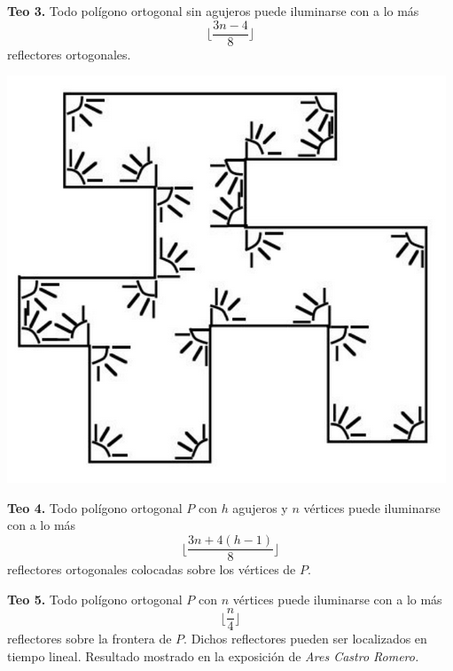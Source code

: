 \begin{center}
  \textbf{Teo 3.} Todo polígono ortogonal sin agujeros puede iluminarse
  con a lo más
  \[\lfloor \frac{3n - 4}{8} \rfloor\]
  reflectores ortogonales.
  
  \includegraphics[scale=0.40]{./Im1.png}\\[0.4cm]
\end{center}

\begin{center}
  \textbf{Teo 4.} Todo polígono ortogonal $P$ con $h$ agujeros y $n$ vértices
  puede iluminarse con a lo más
  \[\lfloor\frac{3n + 4(h-1)}{8}\rfloor\]
  reflectores ortogonales colocadas sobre los vértices de $P$.
\end{center}

\begin{center}
  \textbf{Teo 5.} Todo polígono ortogonal $P$ con $n$ vértices puede
  iluminarse con a lo más
  \[\lfloor \frac{n}{4}\rfloor\]
  reflectores sobre la frontera de $P$.
  Dichos reflectores pueden ser localizados
  en tiempo lineal. Resultado mostrado en la exposición de \textit{Ares Castro Romero.}
\end{center}

